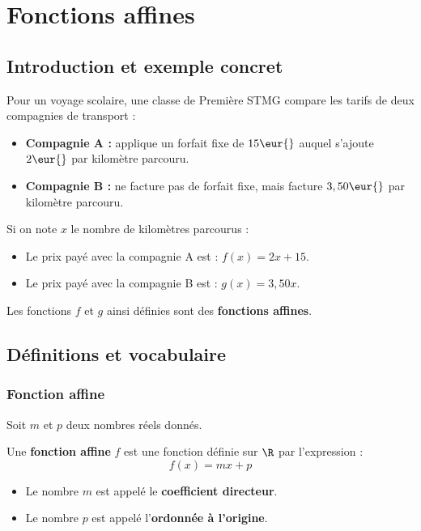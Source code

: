 \chapter{Fonctions affines}

\section{Introduction et exemple concret}

\begin{ex}
	Pour un voyage scolaire, une classe de Première STMG compare les tarifs de deux compagnies de transport :
	\begin{itemize}
		\item \textbf{Compagnie A :} applique un forfait fixe de $15\eur{}$ auquel s'ajoute $2\eur{}$ par kilomètre parcouru.
		\item \textbf{Compagnie B :} ne facture pas de forfait fixe, mais facture $3,50\eur{}$ par kilomètre parcouru.
	\end{itemize}

	Si on note $x$ le nombre de kilomètres parcourus :
	\begin{itemize}
		\item Le prix payé avec la compagnie A est : $f(x) = 2x + 15$.
		\item Le prix payé avec la compagnie B est : $g(x) = 3,50x$.
	\end{itemize}

	Les fonctions $f$ et $g$ ainsi définies sont des \textbf{fonctions affines}.
\end{ex}

\section{Définitions et vocabulaire}

\subsection{Fonction affine}

\begin{defn}
	Soit $m$ et $p$ deux nombres réels donnés.

	Une \textbf{fonction affine} $f$ est une fonction définie sur $\R$ par l'expression :
	\[
		f(x) = mx + p
	\]

	\begin{itemize}
		\item Le nombre $m$ est appelé le \textbf{coefficient directeur}.
		\item Le nombre $p$ est appelé l'\textbf{ordonnée à l'origine}.
	\end{itemize}
\end{defn}

